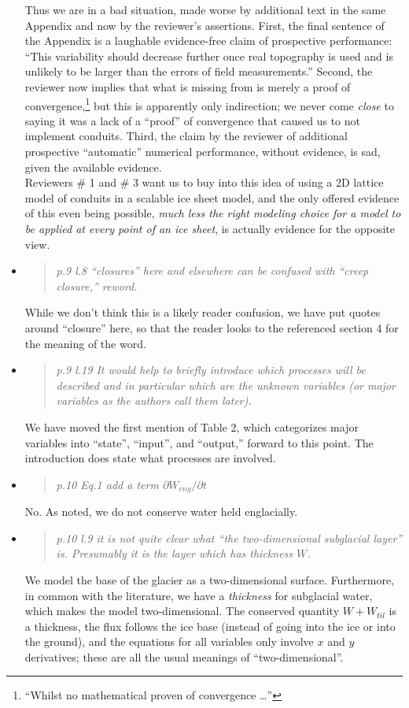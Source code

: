 \documentclass[11pt,reqno]{amsart}
\newcommand{\reply}[2]{
\medskip\medskip
\item  \begin{quote}
\emph{#1}
\end{quote}

\medskip
\noindent #2}
\begin{document}
\begin{itemize}
{\indent Thus we are in a bad situation, made worse by additional text in the same Appendix and now by the reviewer's assertions.  First, the final sentence of the Appendix is a laughable evidence-free claim of prospective performance: ``This variability should decrease further once real topography is used and is unlikely to be larger than the errors of field measurements.''  Second, the reviewer now implies that what is missing from \cite{Werderetal2013} is merely a proof of convergence,\footnote{``Whilst no mathematical proven of convergence \dots''} but this is apparently only indirection; we never come \emph{close} to saying it was a lack of a ``proof'' of convergence that caused us to not implement conduits.  Third, the claim by the reviewer of additional prospective ``automatic'' numerical performance, without evidence, is sad, given the available evidence. \\
\indent Reviewers \# 1 and \# 3 want us to buy into this idea of using a 2D lattice model of conduits in a scalable ice sheet model, and the only offered evidence of this even being possible, \emph{much less the right modeling choice for a model to be applied at every point of an ice sheet}, is actually evidence for the opposite view.}

\reply{p.9 l.8 ``closures'' here and elsewhere can be confused with ``creep closure,'' reword.}
{While we don't think this is a likely reader confusion, we have put quotes around ``closure'' here, so that the reader looks to the referenced section 4 for the meaning of the word.}

\reply{p.9 l.19 It would help to briefly introduce which processes will be described and in
particular which are the unknown variables (or major variables as the authors call
them later).}
{We have moved the first mention of Table 2, which categorizes major variables into ``state'', ``input'', and ``output,'' forward to this point.  The introduction does state what processes are involved.}

\reply{p.10 Eq.1 add a term $\partial W_{eng}/\partial t$}
{No.  As noted, we do not conserve water held englacially.}

\reply{p.10 l.9 it is not quite clear what ``the two-dimensional subglacial layer'' is. Presumably it is the layer which has thickness $W$.}
{We model the base of the glacier as a two-dimensional surface.  Furthermore, in common with the literature, we have a \emph{thickness} for subglacial water, which makes the model two-dimensional.  The conserved quantity $W+W_{til}$ is a thickness, the flux follows the ice base (instead of going into the ice or into the ground), and the equations for all variables only involve $x$ and $y$ derivatives; these are all the usual meanings of ``two-dimensional''.}


\end{itemize}
\end{document}
